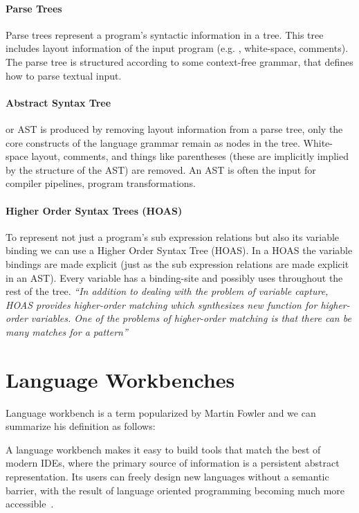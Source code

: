 \paragraph{Parse Trees}
Parse trees represent a program's syntactic information in a tree. This tree includes layout information of the input program (e.g. ,  white-space, comments). The parse tree is structured according to some context-free grammar, that defines how to parse textual input.

\paragraph{Abstract Syntax Tree}
or AST is produced by removing layout information from a parse tree, only the core constructs of the language grammar remain as nodes in the tree. White-space layout, comments, and things like parentheses (these are implicitly implied by the structure of the AST) are removed. An AST is often the input for compiler pipelines, program transformations.

\paragraph{Higher Order Syntax Trees (HOAS)}
To represent not just a program's sub expression relations but also its variable binding we can use a Higher Order Syntax Tree (HOAS)\cite{Pfenning1988}. In a HOAS the variable bindings are made explicit (just as the sub expression relations are made explicit in an AST). Every variable has a binding-site and possibly uses throughout the rest of the tree. \textit{``In addition to dealing with the problem of variable capture, HOAS provides higher-order matching which synthesizes new function for higher-order  variables. One of the problems of higher-order matching is that there can be many matches for a pattern''}~\cite{Visser2001}


\section{Language Workbenches} \label{rascal}
Language workbench is a term popularized by Martin Fowler and we can summarize his definition as follows:

A language workbench makes it easy to build tools that match the best of modern IDEs, where the primary source of information is a persistent abstract representation. Its users can freely design new languages without a semantic barrier, with the result of language oriented programming becoming much more accessible~\cite{Fowler2005}.

